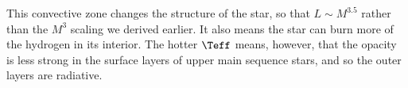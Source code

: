 This convective zone changes the structure of the star, so that $L\sim M^{3.5}$ rather than the $M^{3}$ scaling we derived earlier.  It also means the star can burn more of the hydrogen in its interior.  The hotter $\Teff$ means, however, that the opacity is less strong in the surface layers of upper main sequence stars, and so the outer layers are radiative.  

